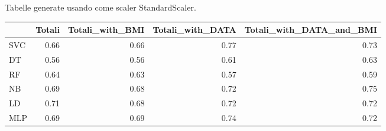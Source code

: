 \documentclass[12pt,italian]{report}
\begin{document}
Tabelle generate usando come scaler StandardScaler.
\begin{table}[ht]
	\begin{center}
		\begin{adjustbox}{max width=\textwidth, max totalheight= {3.3cm}}
			\begin{tabular}{lrrrr}
				\toprule
				{} &    Totali &  Totali\_with\_BMI &  Totali\_with\_DATA &  Totali\_with\_DATA\_and\_BMI \\
				\midrule
				SVC &  0.66 &         0.66 &          \cellcolor{orange}0.77 &                  0.73 \\
				DT  &  0.56 &         0.56 &          0.61 &                  0.63 \\
				RF  &  0.64 &         0.63 &          0.57 &                  0.59 \\
				NB  &  0.69 &         0.68 &          0.72 &                  \cellcolor{cyan}0.75 \\
				LD  &  0.71 &         0.68 &          \cellcolor{cyan}0.72 &                  0.72 \\
				MLP &  0.69 &         0.69 &          \cellcolor{cyan}0.74 &                  0.72 \\
				\bottomrule
			\end{tabular}
		\end{adjustbox}
	\end{center}
\end{table}
\end{document}
